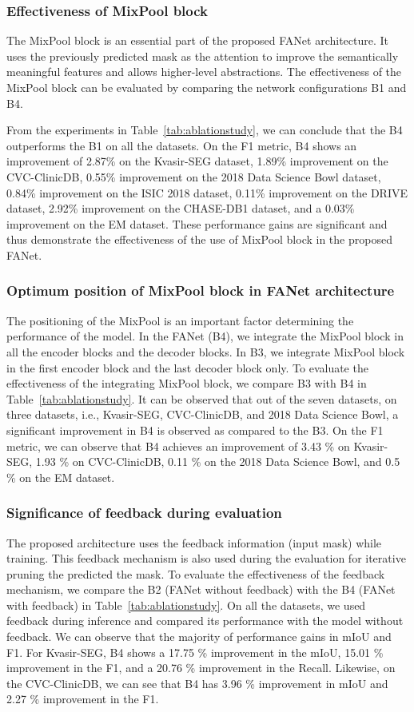 \documentclass[journal]{IEEEtran}
\begin{document}
\subsubsection{Effectiveness of MixPool block}
The MixPool block is an essential part of the proposed FANet architecture. It uses the previously predicted mask as the attention to improve the semantically meaningful features and allows higher-level abstractions.  The effectiveness of the MixPool block can be evaluated by comparing the network configurations B1 and B4. 



From the experiments in Table~\ref{tab:ablationstudy}, we can conclude that the B4 outperforms the B1 on all the datasets. On the F1 metric, B4 shows an improvement of 2.87\% on the Kvasir-SEG dataset, 1.89\% improvement on the CVC-ClinicDB, 0.55\% improvement on the 2018 Data Science Bowl dataset, 0.84\% improvement on the ISIC 2018 dataset, 0.11\% improvement on the DRIVE dataset, 2.92\% improvement on the CHASE-DB1 dataset, and a 0.03\% improvement on the EM dataset. These performance gains are significant and thus demonstrate the effectiveness of the use of MixPool block in the proposed FANet. 



\subsubsection{Optimum position of MixPool block in FANet architecture}
The positioning of the MixPool is an important factor determining the performance of the model. In the FANet (B4), we integrate the MixPool block in all the encoder blocks and the decoder blocks. In B3, we integrate MixPool block in the first encoder block and the last decoder block only. To evaluate the effectiveness of the integrating MixPool block, we compare B3 with B4 in Table~\ref{tab:ablationstudy}. It can be observed that out of the seven datasets, on three datasets, i.e., Kvasir-SEG, CVC-ClinicDB, and 2018 Data Science Bowl, a  significant improvement in B4 is observed as compared to the B3. On the F1 metric, we can observe that B4 achieves an improvement of 3.43 \% on Kvasir-SEG, 1.93 \% on CVC-ClinicDB, 0.11 \% on the 2018 Data Science Bowl, and 0.5 \% on the EM dataset. 
\subsubsection{Significance of feedback during evaluation}
The proposed architecture uses the feedback information (input mask) while training. This feedback mechanism is also used during the evaluation for iterative pruning the predicted the mask. To evaluate the effectiveness of the feedback mechanism, we compare the B2 (FANet without feedback) with the B4 (FANet with feedback) in Table~\ref{tab:ablationstudy}. On all the datasets, we used feedback during inference and compared its performance with the model without feedback. We can observe that the majority of performance gains in \ac{mIoU} and F1. For Kvasir-SEG,  B4 shows a 17.75 \% improvement in the  mIoU, 15.01 \% improvement in the F1, and a 20.76 \% improvement in the Recall. Likewise, on the CVC-ClinicDB, we can see that B4 has 3.96 \% improvement in  \ac{mIoU} and 2.27 \% improvement in the F1.
\end{document}
